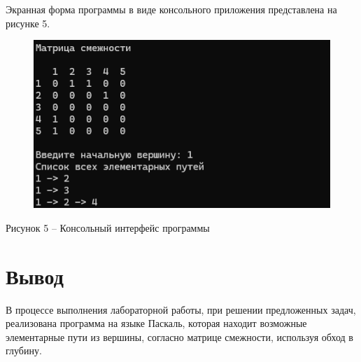 \documentclass[a4paper,14pt]{extarticle}
\begin{document}
  \pagebreak
  Экранная форма программы в виде консольного приложения представлена на рисунке 5.

  \begin{figure}[h]
    \centering
    \includegraphics[width=0.8\linewidth]{images/image.png}
  \end{figure}
  \begin{center}
    Рисунок 5 – Консольный интерфейс программы
  \end{center}

  \section*{\hspace{12.5mm}Вывод}
  В процессе выполнения лабораторной работы, при решении предложенных задач, реализована программа на языке Паскаль, которая находит возможные элементарные пути из вершины, согласно матрице смежности, используя обход в глубину.
\end{document}
